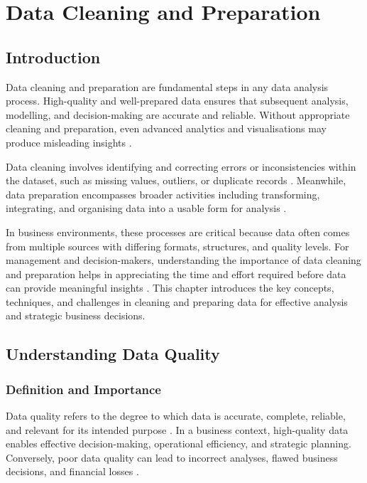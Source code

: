 \chapter{Data Cleaning and Preparation}

\section{Introduction}

Data cleaning and preparation are fundamental steps in any data analysis process. High-quality and well-prepared data ensures that subsequent analysis, modelling, and decision-making are accurate and reliable. Without appropriate cleaning and preparation, even advanced analytics and visualisations may produce misleading insights \cite{kim2020data}. 

Data cleaning involves identifying and correcting errors or inconsistencies within the dataset, such as missing values, outliers, or duplicate records \cite{rahm2000data}. Meanwhile, data preparation encompasses broader activities including transforming, integrating, and organising data into a usable form for analysis \cite{kotu2014predictive}. 

In business environments, these processes are critical because data often comes from multiple sources with differing formats, structures, and quality levels. For management and decision-makers, understanding the importance of data cleaning and preparation helps in appreciating the time and effort required before data can provide meaningful insights \cite{gandomi2015beyond}. This chapter introduces the key concepts, techniques, and challenges in cleaning and preparing data for effective analysis and strategic business decisions.

\section{Understanding Data Quality}

\subsection{Definition and Importance}

Data quality refers to the degree to which data is accurate, complete, reliable, and relevant for its intended purpose \cite{wang1996beyond}. In a business context, high-quality data enables effective decision-making, operational efficiency, and strategic planning. Conversely, poor data quality can lead to incorrect analyses, flawed business decisions, and financial losses \cite{redman1998impact}.

